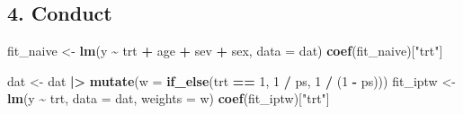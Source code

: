 \documentclass[
]{article}
\newenvironment{Shaded}{\begin{snugshade}}{\end{snugshade}}
\newcommand{\AttributeTok}[1]{\textcolor[rgb]{0.13,0.29,0.53}{#1}}
\newcommand{\DecValTok}[1]{\textcolor[rgb]{0.00,0.00,0.81}{#1}}
\newcommand{\FunctionTok}[1]{\textcolor[rgb]{0.13,0.29,0.53}{\textbf{#1}}}
\newcommand{\NormalTok}[1]{#1}
\newcommand{\OtherTok}[1]{\textcolor[rgb]{0.56,0.35,0.01}{#1}}
\newcommand{\SpecialCharTok}[1]{\textcolor[rgb]{0.81,0.36,0.00}{\textbf{#1}}}
\newcommand{\StringTok}[1]{\textcolor[rgb]{0.31,0.60,0.02}{#1}}
\begin{document}
\subsection{4. Conduct}\label{conduct}

\begin{Shaded}
\begin{Highlighting}[]
\NormalTok{fit\_naive }\OtherTok{\textless{}{-}} \FunctionTok{lm}\NormalTok{(y }\SpecialCharTok{\textasciitilde{}}\NormalTok{ trt }\SpecialCharTok{+}\NormalTok{ age }\SpecialCharTok{+}\NormalTok{ sev }\SpecialCharTok{+}\NormalTok{ sex, }\AttributeTok{data =}\NormalTok{ dat)}
\FunctionTok{coef}\NormalTok{(fit\_naive)[}\StringTok{"trt"}\NormalTok{]}
\end{Highlighting}
\end{Shaded}

\begin{Shaded}
\end{Shaded}

\begin{Shaded}
\begin{Highlighting}[]
\NormalTok{dat }\OtherTok{\textless{}{-}}\NormalTok{ dat }\SpecialCharTok{|\textgreater{}}
  \FunctionTok{mutate}\NormalTok{(}\AttributeTok{w =} \FunctionTok{if\_else}\NormalTok{(trt }\SpecialCharTok{==} \DecValTok{1}\NormalTok{, }\DecValTok{1} \SpecialCharTok{/}\NormalTok{ ps, }\DecValTok{1} \SpecialCharTok{/}\NormalTok{ (}\DecValTok{1} \SpecialCharTok{{-}}\NormalTok{ ps)))}
\NormalTok{fit\_iptw }\OtherTok{\textless{}{-}} \FunctionTok{lm}\NormalTok{(y }\SpecialCharTok{\textasciitilde{}}\NormalTok{ trt, }\AttributeTok{data =}\NormalTok{ dat, }\AttributeTok{weights =}\NormalTok{ w)}
\FunctionTok{coef}\NormalTok{(fit\_iptw)[}\StringTok{"trt"}\NormalTok{]}
\end{Highlighting}
\end{Shaded}
\end{document}
